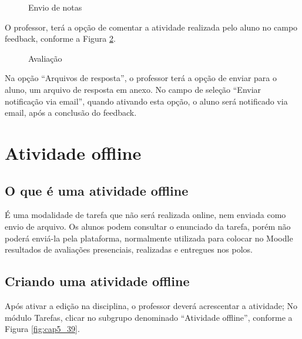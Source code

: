 \begin{figure}[!htbp]
 \begin{center}
\caption{Envio de notas}
  \label{fig:cap5_37}
 \end{center}
\end{figure}

O professor, terá a opção de comentar a atividade realizada pelo aluno no campo feedback, conforme a Figura \ref{fig:cap5_38}.
\begin{figure}[!htbp]
 \begin{center}
\caption{Avaliação}
  \label{fig:cap5_38}
 \end{center}
\end{figure}
Na opção “Arquivos de resposta”, o professor terá a opção de enviar para o aluno, um arquivo de resposta em anexo. No campo de seleção “Enviar notificação via email”, quando ativando esta opção, o aluno será notificado via email, após a conclusão do feedback.

\section{Atividade offline}

\subsection{O que é uma atividade offline}
É uma modalidade de tarefa que não será realizada online, nem enviada como envio de arquivo. Os alunos podem consultar o enunciado da tarefa, porém não poderá enviá-la pela plataforma, normalmente utilizada para colocar no Moodle resultados de avaliações presenciais, realizadas e entregues nos polos.
\subsection{Criando uma atividade offline}
Após ativar a edição na disciplina, o professor deverá acrescentar a atividade; No módulo Tarefas, clicar no subgrupo denominado “Atividade offline”, conforme a Figura \ref{fig:cap5_39}.

